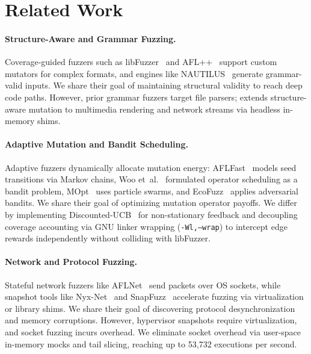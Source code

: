 \section{Related Work}
\label{sec:related}

\paragraph{Structure-Aware and Grammar Fuzzing.}
Coverage-guided fuzzers such as libFuzzer~\cite{serebryany2016libfuzzer} and AFL++~\cite{fioraldi2020aflplusplus} support custom mutators for complex formats, and engines like NAUTILUS~\cite{aschermann2019nautilus} generate grammar-valid inputs.
We share their goal of maintaining structural validity to reach deep code paths.
However, prior grammar fuzzers target file parsers; \tool extends structure-aware mutation to multimedia rendering and network streams via headless in-memory shims.

\paragraph{Adaptive Mutation and Bandit Scheduling.}
Adaptive fuzzers dynamically allocate mutation energy: AFLFast~\cite{bohme2016aflfast} models seed transitions via Markov chains, Woo et~al.~\cite{woo2013scheduling} formulated operator scheduling as a bandit problem, MOpt~\cite{lyu2019mopt} uses particle swarms, and EcoFuzz~\cite{yue2020ecofuzz} applies adversarial bandits.
We share their goal of optimizing mutation operator payoffs.
We differ by implementing Discounted-UCB~\cite{garivier2011nonstationary} for non-stationary feedback and decoupling coverage accounting via GNU linker wrapping (\texttt{-Wl,--wrap}) to intercept edge rewards independently without colliding with libFuzzer.

\paragraph{Network and Protocol Fuzzing.}
Stateful network fuzzers like AFLNet~\cite{pham2020aflnet} send packets over OS sockets, while snapshot tools like Nyx-Net~\cite{schumilo2021nyxnet} and SnapFuzz~\cite{vanderveen2022snapfuzz} accelerate fuzzing via virtualization or library shims.
We share their goal of discovering protocol desynchronization and memory corruptions.
However, hypervisor snapshots require virtualization, and socket fuzzing incurs overhead.
We eliminate socket overhead via user-space in-memory mocks and tail slicing, reaching up to 53{,}732 executions per second.
